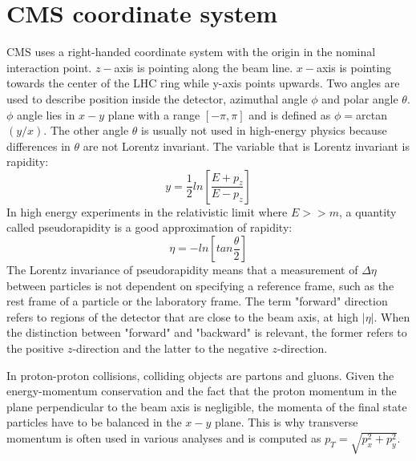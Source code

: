 
\section{CMS coordinate system}

CMS uses a right-handed coordinate system with the origin in the nominal interaction point. $z-$axis is pointing along the beam line. $x-$axis is pointing towards the center of the LHC ring while y-axis points upwards. Two angles are used to describe position inside the detector, azimuthal angle $\phi$ and polar angle $\theta$. $\phi$ angle lies in $x-y$ plane with a range $[-\pi,\pi]$  and is defined as $\phi=$arctan$(y/x)$. The other angle $\theta$ is usually not used in high-energy physics because differences in $\theta$ are not Lorentz invariant.
The variable that is Lorentz invariant is rapidity:
\begin{equation}
y=\frac{1}{2}ln\left[ \frac{E+p_z}{E-p_z}\right]
\end{equation}
In high energy experiments in the relativistic limit where $E>>m$, a quantity called pseudorapidity is a good approximation of rapidity:
\begin{equation}
\eta = -ln \left[ tan \frac{\theta}{2} \right]
\end{equation}
The Lorentz invariance of pseudorapidity means that a measurement of $\Delta\eta$ between particles is not dependent on specifying a reference frame, such as the rest frame of a particle or the laboratory frame. The term "forward" direction refers to regions of the detector that are close to the beam axis, at high $|\eta|$. When the distinction between "forward" and "backward" is relevant, the former refers to the positive $z$-direction and the latter to the negative $z$-direction.
\par In proton-proton collisions, colliding objects are partons and gluons. Given the energy-momentum conservation and the fact that the proton momentum in the plane perpendicular to the beam axis is negligible, the momenta of the final state particles have to be balanced in the $x-y$ plane. This is why transverse momentum is often used in various analyses and is computed as $p_T=\sqrt{p_x^2+p_y^2}$.



